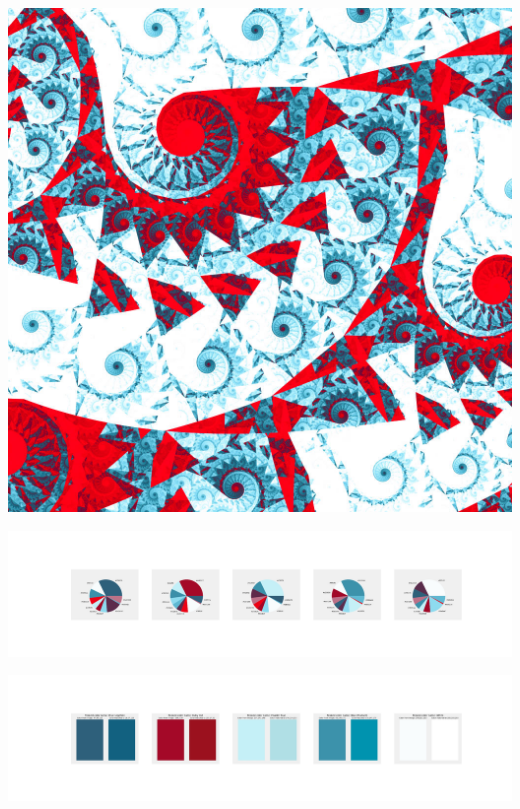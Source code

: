 \documentclass[11pt]{article}
\begin{document}
\begin{landscape}
    \begin{center}
    \includegraphics[width=\textwidth]{./nbimg/file (373).jpg}
    \end{center}

    \begin{center}
    \includegraphics[width=250mm]{./nbimg/pie-304.jpg}
    \end{center}

    \begin{center}
    \includegraphics[width=250mm]{./nbimg/peak-304.jpg}
    \end{center}
    


\end{landscape}
\end{document}

